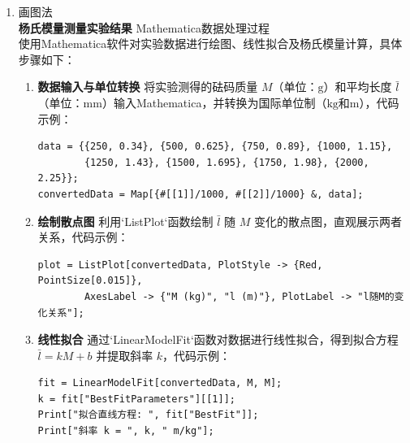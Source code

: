 \documentclass[11pt]{article}
\begin{document}
\begin{enumerate}
代入数据，可得杨氏模量的计算值：
\[
k = 1.087 \times 10^{-3} \, \text{m·kg}^{-1}, \quad \bar{Y} = \frac{4 g L}{\pi d^2 |k|} = 2.49 \times 10^{11} \, \text{N·m}^{-2} \tag{24}
\]

仍继承逐差法时的不确定度，与标准值 \( Y_0 = 2.3 \times 10^{11} \, \text{N·m}^{-2} \) 进行比较，得到相对误差：
\[
Y = \bar{Y} \pm \Delta Y = (2.5 \pm 0.1) \times 10^{11} \, \text{N·m}^{-2}, \quad \eta = \frac{Y - Y_0}{Y_0} \times 100\% = 8.3\% \tag{25}
\]

\item 画图法
\\\textbf{杨氏模量测量实验结果}
Mathematica数据处理过程 \\
使用Mathematica软件对实验数据进行绘图、线性拟合及杨氏模量计算，具体步骤如下：

\begin{enumerate}
    \item \textbf{数据输入与单位转换}
    将实验测得的砝码质量 \( M \)（单位：\(\text{g}\)）和平均长度 \( \bar{l} \)（单位：\(\text{mm}\)）输入Mathematica，并转换为国际单位制（\(\text{kg}\)和\(\text{m}\)），代码示例：
    \begin{verbatim}
data = {{250, 0.34}, {500, 0.625}, {750, 0.89}, {1000, 1.15}, 
        {1250, 1.43}, {1500, 1.695}, {1750, 1.98}, {2000, 2.25}};
convertedData = Map[{#[[1]]/1000, #[[2]]/1000} &, data];
    \end{verbatim}

    \item \textbf{绘制散点图}
    利用`ListPlot`函数绘制 \( \bar{l} \) 随 \( M \) 变化的散点图，直观展示两者关系，代码示例：
    \begin{verbatim}
plot = ListPlot[convertedData, PlotStyle -> {Red, PointSize[0.015]}, 
        AxesLabel -> {"M (kg)", "l (m)"}, PlotLabel -> "l随M的变化关系"];
    \end{verbatim}

    \item \textbf{线性拟合}
    通过`LinearModelFit`函数对数据进行线性拟合，得到拟合方程 \( \bar{l} = kM + b \) 并提取斜率 \( k \)，代码示例：
    \begin{verbatim}
fit = LinearModelFit[convertedData, M, M];
k = fit["BestFitParameters"][[1]];
Print["拟合直线方程: ", fit["BestFit"]];
Print["斜率 k = ", k, " m/kg"];
    \end{verbatim}


\end{enumerate}
\end{enumerate}
\end{document}
